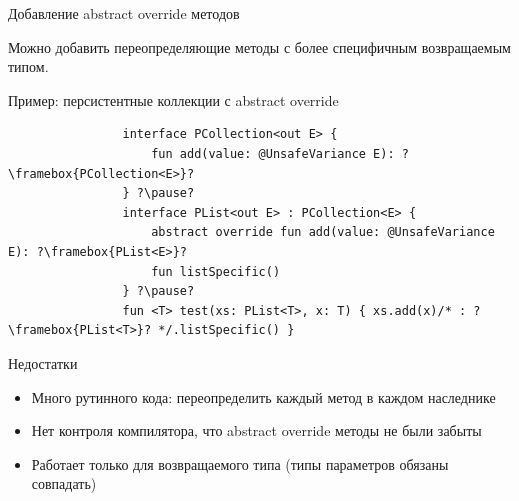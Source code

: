 \documentclass[aspectratio=169,usenames,dvipsnames]{beamer}
\begin{document}
    \begin{frame}[fragile]{Добавление abstract override методов}


        Можно добавить переопределяющие методы с более специфичным возвращаемым типом.

        \begin{block}{Пример: персистентные коллекции с abstract override}
            \begin{verbatim}
                interface PCollection<out E> {
                    fun add(value: @UnsafeVariance E): ?\framebox{PCollection<E>}?
                } ?\pause?
                interface PList<out E> : PCollection<E> {
                    abstract override fun add(value: @UnsafeVariance E): ?\framebox{PList<E>}?
                    fun listSpecific()
                } ?\pause?
                fun <T> test(xs: PList<T>, x: T) { xs.add(x)/* : ?\framebox{PList<T>}? */.listSpecific() }
            \end{verbatim}
        \end{block}

        \pause

        \begin{block}{Недостатки}
            \begin{itemize}
                \item Много рутинного кода: переопределить каждый метод в каждом наследнике
                \item Нет контроля компилятора, что abstract override методы не были забыты
                \item Работает только для возвращаемого типа (типы параметров обязаны совпадать)
            \end{itemize}
        \end{block}
    \end{frame}
    \mode*
\end{document}
